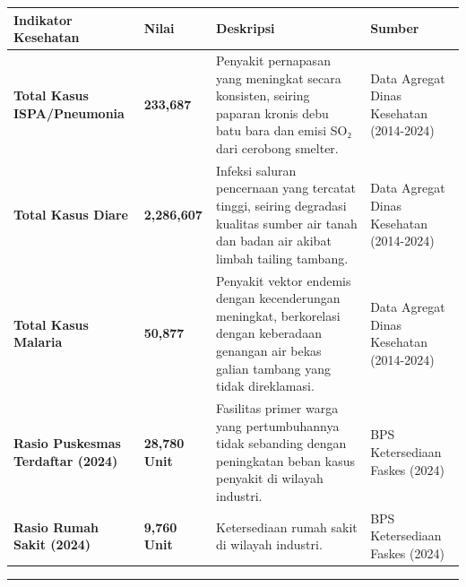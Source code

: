 \documentclass[
]{article}
\newcounter{none} %
\begin{document}
{\def\LTcaptype{none} %
\begin{longtable}[]{@{}
  >{\raggedright\arraybackslash}p{}
  >{\raggedright\arraybackslash}p{}
  >{\raggedright\arraybackslash}p{}
  >{\raggedright\arraybackslash}p{}@{}}
\toprule\noalign{}
\begin{minipage}[b]{\linewidth}\raggedright
Indikator Kesehatan
\end{minipage} & \begin{minipage}[b]{\linewidth}\raggedright
Nilai
\end{minipage} & \begin{minipage}[b]{\linewidth}\raggedright
Deskripsi
\end{minipage} & \begin{minipage}[b]{\linewidth}\raggedright
Sumber
\end{minipage} \\
\midrule\noalign{}
\endhead
\bottomrule\noalign{}
\endlastfoot
\textbf{Total Kasus ISPA/Pneumonia} & \textbf{233,687} & Penyakit
pernapasan yang meningkat secara konsisten, seiring paparan kronis debu
batu bara dan emisi SO₂ dari cerobong smelter. & Data Agregat Dinas
Kesehatan (2014-2024) \\
\textbf{Total Kasus Diare} & \textbf{2,286,607} & Infeksi saluran
pencernaan yang tercatat tinggi, seiring degradasi kualitas sumber air
tanah dan badan air akibat limbah tailing tambang. & Data Agregat Dinas
Kesehatan (2014-2024) \\
\textbf{Total Kasus Malaria} & \textbf{50,877} & Penyakit vektor endemis
dengan kecenderungan meningkat, berkorelasi dengan keberadaan genangan
air bekas galian tambang yang tidak direklamasi. & Data Agregat Dinas
Kesehatan (2014-2024) \\
\textbf{Rasio Puskesmas Terdaftar (2024)} & \textbf{28,780 Unit} &
Fasilitas primer warga yang pertumbuhannya tidak sebanding dengan
peningkatan beban kasus penyakit di wilayah industri. & BPS Ketersediaan
Faskes (2024) \\
\textbf{Rasio Rumah Sakit (2024)} & \textbf{9,760 Unit} & Ketersediaan
rumah sakit di wilayah industri. & BPS Ketersediaan Faskes (2024) \\
\end{longtable}
}

\begin{center}\rule{0.5\linewidth}{0.5pt}\end{center}
\end{document}
